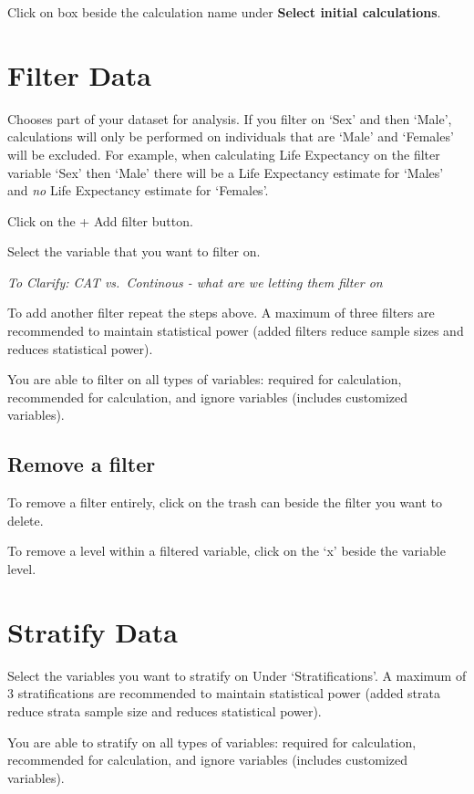 \documentclass[]{book}
\begin{document}
Click on box beside the calculation name under \textbf{Select initial
calculations}.

\section{Filter Data}\label{filter-data}

Chooses part of your dataset for analysis. If you filter on
`Sex' and then `Male', calculations will only be performed on
individuals that are `Male' and `Females' will be excluded. For example,
when calculating Life Expectancy on the filter variable `Sex' then
`Male' there will be a Life Expectancy estimate for `Males' and
\emph{no} Life Expectancy estimate for `Females'.

Click on the + Add filter button.

Select the variable that you want to filter on.

\emph{To Clarify: CAT vs.~Continous - what are we letting them filter
on}

To add another filter repeat the steps above. A maximum of three filters
are recommended to maintain statistical power (added filters reduce
sample sizes and reduces statistical power).

You are able to filter on all types of variables: required for
calculation, recommended for calculation, and ignore variables (includes
customized variables).

\subsection{Remove a filter}\label{remove-a-filter}

To remove a filter entirely, click on the trash can beside the filter
you want to delete.

To remove a level within a filtered variable, click on the `x' beside
the variable level.

\section{Stratify Data}\label{stratify-data}

Select the variables you want to stratify on Under `Stratifications'. A
maximum of 3 stratifications are recommended to maintain statistical
power (added strata reduce strata sample size and reduces statistical
power).

You are able to stratify on all types of variables: required for
calculation, recommended for calculation, and ignore variables (includes
customized variables).
\end{document}
